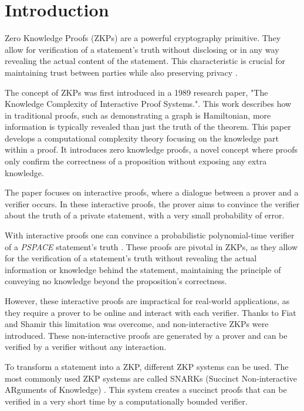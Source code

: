 \documentclass[conference,comsoc,10pt]{IEEEtran}
\begin{document}
\section{Introduction}
    Zero Knowledge Proofs (ZKPs) are a powerful cryptography primitive. They allow
    for verification of a statement's truth without disclosing or in any way revealing
    the actual content of the statement. This characteristic is crucial for
    maintaining trust between parties while also preserving privacy \cite{goldreich1991proofs}.

    The concept of ZKPs was first introduced in a 1989 research paper, "The
    Knowledge Complexity of Interactive Proof Systems."\cite{Goldwasser1989}.
    This work describes how in traditional proofs, such as demonstrating a graph
    is Hamiltonian, more information is typically revealed than just the truth of
    the theorem. This paper develops a computational complexity theory focusing
    on the knowledge part within a proof. It introduces zero knowledge proofs,
    a novel concept where proofs only confirm the correctness of a proposition
    without exposing any extra knowledge.

    The paper focuses on interactive proofs, where a dialogue between a prover and
    a verifier occurs. In these interactive proofs, the prover aims to convince
    the verifier about the truth of a private statement, with a very small
    probability of error.

    With interactive proofs one can convince a probabilistic polynomial-time verifier
    of a \emph{PSPACE} statement's truth \cite{Shamir1992, Lund1992}. These proofs
    are pivotal in ZKPs, as they allow for the verification of a statement's truth
    without revealing the actual information or knowledge behind the statement,
    maintaining the principle of conveying no knowledge beyond the proposition's
    correctness.

    However, these interactive proofs are impractical for real-world applications, as they
    require a prover to be online and interact with each verifier. Thanks to Fiat
    and Shamir \cite{Fiat} this limitation was overcome, and non-interactive
    ZKPs were introduced. These non-interactive proofs are
    generated by a prover and can be verified by a verifier without any
    interaction.

    To transform a statement into a ZKP, different ZKP systems can be used. The most
    commonly used ZKP systems are called SNARKs (Succinct Non-interactive ARguments
    of Knowledge) \cite{Groth16}. This system creates a succinct proofs that can be
    verified in a very short time by a computationally bounded verifier.
\end{document}
